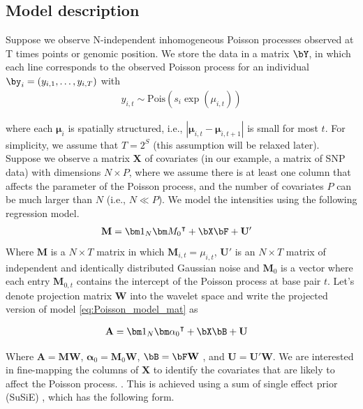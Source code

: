  
\subsection{Model description}\label{sec:model_desc}

  Suppose we observe N-independent inhomogeneous Poisson processes observed at T times points or genomic position. We store the data in a matrix $\bY$, in which each line corresponds to the observed  Poisson process for an individual $\by_i= (y_{i,1}, \ldots, y_{i,T})$ with
 \begin{align} \label{eq:Poisson_model}
    y_{i,t} \sim \text{Pois}(s_i\exp( \mu_{i,t} ))
 \end{align}

 

 where each $\bm{\mu}_i$ is spatially structured, i.e., $|\bm{\mu}_{i,t} -\bm{\mu}_{i,t+1}|$ is small for most $t$. For simplicity, we assume that $T = 2^S$ (this assumption will be relaxed later). Suppose we observe a  matrix $\bm{X}$ of covariates (in our example, a matrix of SNP data) with dimensions $N \times P$, where we assume there is at least one column that affects the parameter of the Poisson process, and the number of covariates $P$ can be much larger than $N$ (i.e., $N \ll P$). We model the intensities using the following regression model. 
 \begin{align} \label{eq:Poisson_model_mat}
   \mathbf{  M }  &= {\bm 1}_N {\bm M_0}^{\intercal} +    \bX\bF +  \mathbf{ U}' 
 \end{align}
 Where $ \mathbf{  M } $ is a $N\times T$ matrix in which  $ \mathbf{  M } _{i,t} = \mu_{i,t}$, $\mathbf{U}'$ is an $N \times T$ matrix of independent and identically distributed Gaussian noise and $ \bm M_0 $ is a vector where each entry $\bm M_{0,t}$  contains the intercept of the Poisson process at base pair $t$.   Let's denote projection matrix $\mathbf{W}$ into the wavelet space and write the projected version of model \ref{eq:Poisson_model_mat} as
 
 
 \begin{align} \label{eq:Poisson_model_mat_proj}
   \mathbf{  A }  &= {\bm 1}_N {\bm\alpha_0}^{\intercal} +    \bX\bB +  \mathbf{ U} 
 \end{align}

\noindent Where $\mathbf{  A }=  \mathbf{  M } \mathbf{W} $,  $\bm\alpha_0= \bm  M_0 \mathbf{W}  $, $\bB= \bF\mathbf{W}$ , %
 and $\mathbf{ U} =\mathbf{U}' \mathbf{ W}   $. %
We   are interested in fine-mapping the  columns  of   $\bm{X}$ to identify the covariates that are likely to affect the Poisson process. . This is achieved using a sum of single effect prior (SuSiE) \citep{wang_simple_2020}, which has the following form.

